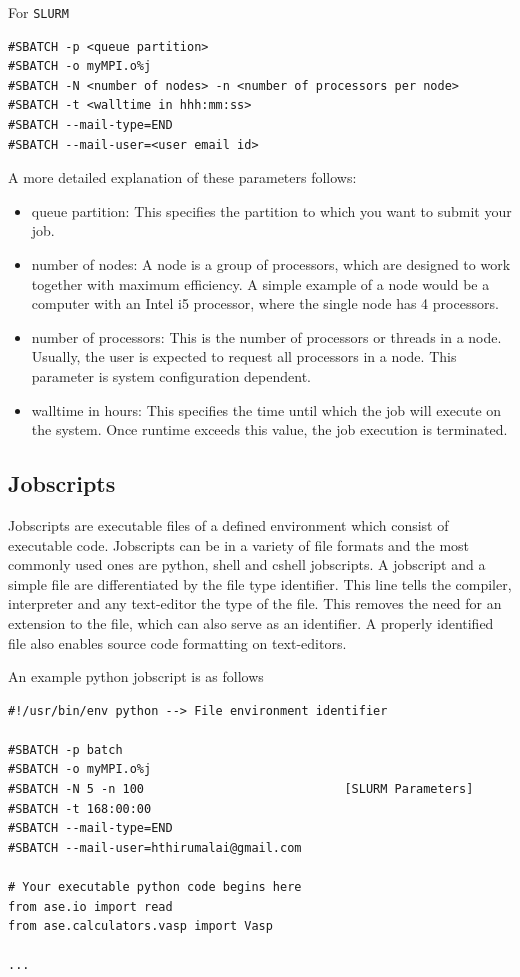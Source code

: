 \documentclass[11pt]{article}
\begin{document}
For \texttt{SLURM}
\begin{verbatim}
#SBATCH -p <queue partition>
#SBATCH -o myMPI.o%j
#SBATCH -N <number of nodes> -n <number of processors per node>
#SBATCH -t <walltime in hhh:mm:ss>
#SBATCH --mail-type=END
#SBATCH --mail-user=<user email id>
\end{verbatim}

A more detailed explanation of these parameters follows:
\begin{itemize}
\item queue partition: This specifies the partition to which you want to submit your job.
\item number of nodes: A node is a group of processors, which are designed to work together with maximum efficiency. A simple example of a node would be a computer with an Intel i5 processor, where the single node has 4 processors.
\item number of processors: This is the number of processors or threads in a node. Usually, the user is expected to request all processors in a node. This parameter is system configuration dependent.
\item walltime in hours: This specifies the time until which the job will execute on the system. Once runtime exceeds this value, the job execution is terminated.
\end{itemize}

\subsection{Jobscripts}
\label{sec-2-2}
Jobscripts are executable files of a defined environment which consist of executable code. Jobscripts can be in a variety of file formats and the most commonly used ones are python, shell and cshell jobscripts.
A jobscript and a simple file are differentiated by the file type identifier. This line tells the compiler, interpreter and any text-editor the type of the file. This removes the need for an extension to the file, which can also serve as an identifier. A properly identified file also enables source code formatting on text-editors.

An example python jobscript is  as follows
\begin{verbatim}
#!/usr/bin/env python --> File environment identifier

#SBATCH -p batch
#SBATCH -o myMPI.o%j
#SBATCH -N 5 -n 100                            [SLURM Parameters]
#SBATCH -t 168:00:00
#SBATCH --mail-type=END
#SBATCH --mail-user=hthirumalai@gmail.com

# Your executable python code begins here
from ase.io import read
from ase.calculators.vasp import Vasp

...
\end{verbatim}
\end{document}

